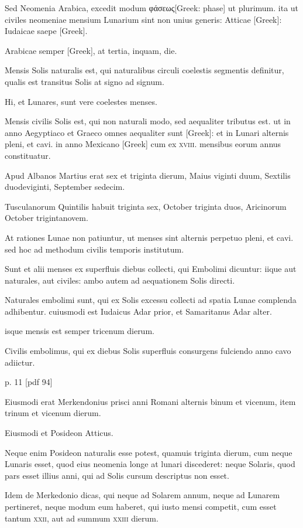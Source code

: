 Sed Neomenia Arabica, excedit modum
 \textgreek{φάσεως[Greek: phase]} ut plurimum. ita ut
civiles neomeniae mensium Lunarium sint non unius generis: Atticae
\textgreek{[Greek]}: Iudaicae saepe \textgreek{[Greek]}.

Arabicae semper \textgreek{[Greek]},
at tertia, inquam, die.

Mensis Solis naturalis est,
qui naturalibus circuli coelestis segmentis definitur, qualis est transitus
Solis at signo ad signum.

Hi, et Lunares, sunt vere coelestes menses.

Mensis civilis Solis est, qui non naturali modo, sed aequaliter tributus
est. ut in anno Aegyptiaco et Graeco omnes aequaliter sunt \textgreek{[Greek]}:
et in Lunari alternis pleni, et cavi. in anno Mexicano \textgreek{[Greek]}
cum ex \textsc{xviii}. mensibus eorum annus constituatur.

Apud Albanos
Martius erat sex et triginta dierum, Maius viginti duum, Sextilis
duodeviginti, September sedecim.

Tusculanorum Quintilis habuit
triginta sex, October triginta duos, Aricinorum October trigintanovem.

At rationes Lunae non patiuntur, ut menses sint alternis
perpetuo pleni, et cavi. sed hoc ad methodum civilis temporis institutum.

Sunt et alii menses ex superfluis diebus collecti, qui Embolimi
dicuntur: iique aut naturales, aut civiles: ambo autem ad aequationem
Solis directi.

Naturales embolimi sunt, qui ex Solis excessu collecti
ad spatia Lunae complenda adhibentur. cuiusmodi est Iudaicus
Adar prior, et Samaritanus Adar alter.

isque mensis est semper tricenum dierum.

Civilis embolimus, qui ex diebus Solis superfluis consurgens
fulciendo anno cavo adiictur.


p. 11 [pdf 94]

Eiusmodi erat Merkendonius
prisci anni Romani alternis binum et vicenum, item trinum et vicenum
dierum.

Eiusmodi et Posideon Atticus.

Neque enim Posideon
naturalis esse potest, quamuis triginta dierum, cum neque Lunaris
esset, quod eius neomenia longe at lunari discederet: neque Solaris,
quod pars esset illius anni, qui ad Solis cursum descriptus non esset.

Idem de Merkedonio dicas, qui neque ad Solarem annum, neque ad
Lunarem pertineret, neque modum eum haberet, qui iusto mensi
competit, cum esset tantum \textsc{xxii}, aut ad summum \textsc{xxiii} dierum.

